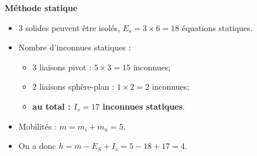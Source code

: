 \documentclass[10pt,fleqn]{article} %
\begin{document}
\begin{multicols}{2}
\textbf{Méthode statique}
\begin{itemize}
\item 3 solides peuvent être isolés, $E_s=3\times 6 =18$ équations statiques.
\item Nombre d'inconnues statiques : 
\begin{itemize}
\item 3 liaisons pivot : $5\times 3=15$ inconnues;
\item 2 liaisons sphère-plan : $1\times 2=2$ inconnues;
\item \textbf{au total : $I_s=17$ inconnues statiques}.
\end{itemize}
\item Mobilités : $m=m_i+m_u=5$.
\item On a donc $h=m-E_S+I_s =5-18+17=4$.
\end{itemize}
\end{multicols}
\end{document}

